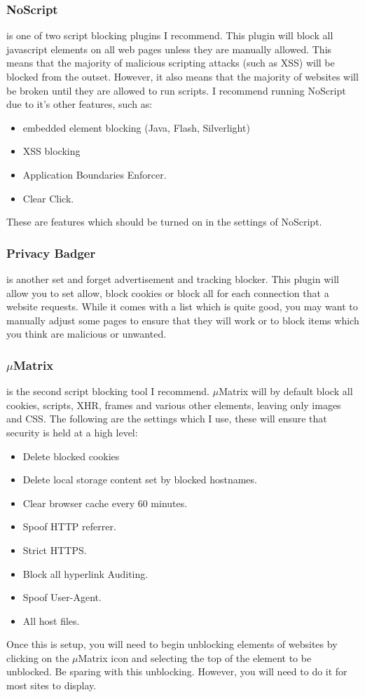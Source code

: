 \documentclass[a4paper,11pt]{book}
\begin{document}
		\subsubsection{NoScript}
			is one of two script blocking plugins I recommend. 
			This plugin will block all javascript elements on all web pages unless they are manually allowed. 
			This means that the majority of malicious scripting attacks (such as XSS) will be blocked from the outset. 
			However, it also means that the majority of websites will be broken until they are allowed to run scripts. 
			I recommend running NoScript due to it's other features, such as:
			\begin{itemize}
				\item embedded element blocking (Java, Flash, Silverlight) 
				\item XSS blocking
				\item Application Boundaries Enforcer. 
				\item Clear Click. 
			\end{itemize}
			These are features which should be turned on in the settings of NoScript. 
		\subsubsection{Privacy Badger}
			is another set and forget advertisement and tracking blocker. 
			This plugin will allow you to set allow, block cookies or block all for each connection that a website requests. 
			While it comes with a list which is quite good, you may want to manually adjust some pages to ensure that they will work or to block items which you think are malicious or unwanted. 
		\subsubsection{$\mu{}$Matrix}
			is the second script blocking tool I recommend. 
			$\mu{}$Matrix will by default block all cookies, scripts, XHR, frames and various other elements, leaving only images and CSS. 
			The following are the settings which I use, these will ensure that security is held at a high level:
			\begin{itemize}
				\item Delete blocked cookies
				\item Delete local storage content set by blocked hostnames. 
				\item Clear browser cache every 60 minutes. 
				\item Spoof HTTP referrer. 
				\item Strict HTTPS.
				\item Block all hyperlink Auditing. 
				\item Spoof User-Agent. 
				\item All host files. 
			\end{itemize}
			Once this is setup, you will need to begin unblocking elements of websites by clicking on the $\mu{}$Matrix icon and selecting the top of the element to be unblocked. 
			Be sparing with this unblocking. However, you will need to do it for most sites to display. 
\end{document}
